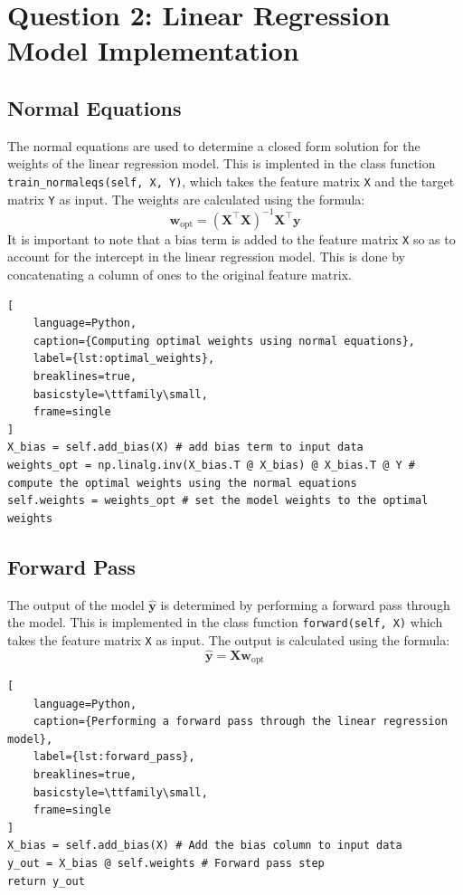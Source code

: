 \documentclass[11pt]{article}
\begin{document}
\section{Question 2: Linear Regression Model Implementation}

\subsection{Normal Equations}
The normal equations are used to determine a closed form solution for the weights of the linear regression model. 
This is implented in the class function \texttt{train\_normaleqs(self, X, Y)}, which takes the feature matrix \texttt{X} and the target matrix \texttt{Y} as input. 
The weights are calculated using the formula:
\begin{equation}
    \mathbf{w}_{\text{opt}} = (\mathbf{X}^\top \mathbf{X})^{-1} \mathbf{X}^\top \mathbf{y}
\end{equation}
It is important to note that a bias term is added to the feature matrix \texttt{X} so as to account for the intercept in the linear regression model. This is done by concatenating a column of ones to the original feature matrix.
\begin{lstlisting}[
    language=Python, 
    caption={Computing optimal weights using normal equations},
    label={lst:optimal_weights},
    breaklines=true,
    basicstyle=\ttfamily\small,
    frame=single
]
X_bias = self.add_bias(X) # add bias term to input data
weights_opt = np.linalg.inv(X_bias.T @ X_bias) @ X_bias.T @ Y # compute the optimal weights using the normal equations
self.weights = weights_opt # set the model weights to the optimal weights
\end{lstlisting}

\subsection{Forward Pass}
The output of the model $\mathbf{\hat{y}}$ is determined by performing a forward pass through the model. This is implemented in the class function 
\texttt{forward(self, X)} which takes the feature matrix \texttt{X} as input. The output is calculated using the formula:
\begin{equation}
    \mathbf{\hat{y}} = \mathbf{X} \mathbf{w}_{\text{opt}}
\end{equation}
\begin{lstlisting}[
    language=Python, 
    caption={Performing a forward pass through the linear regression model},
    label={lst:forward_pass},
    breaklines=true,
    basicstyle=\ttfamily\small,
    frame=single
]
X_bias = self.add_bias(X) # Add the bias column to input data
y_out = X_bias @ self.weights # Forward pass step
return y_out
\end{lstlisting}
\end{document}
